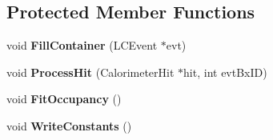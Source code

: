 \subsection*{Protected Member Functions}
\begin{DoxyCompactItemize}
\item 
void {\bfseries Fill\-Container} (L\-C\-Event $\ast$evt)\label{classCALICE_1_1Ahc2OccupancyCalibrator_aab17d7ea8610d706f1a4110a3b4720c0}

\item 
void {\bfseries Process\-Hit} (Calorimeter\-Hit $\ast$hit, int evt\-Bx\-I\-D)\label{classCALICE_1_1Ahc2OccupancyCalibrator_a08d8f75993a010a51e479ef6b1169ec7}

\item 
void {\bfseries Fit\-Occupancy} ()\label{classCALICE_1_1Ahc2OccupancyCalibrator_ab38c7f3009dcb59ec68358f2683e60a5}

\item 
void {\bfseries Write\-Constants} ()\label{classCALICE_1_1Ahc2OccupancyCalibrator_ab68258017b327ea743a09b76a7950521}

\end{DoxyCompactItemize}
